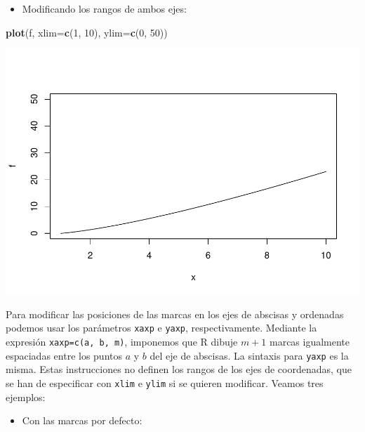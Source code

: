 \documentclass[
]{book}
\newenvironment{Shaded}{\begin{snugshade}}{\end{snugshade}}
\newcommand{\DataTypeTok}[1]{\textcolor[rgb]{0.13,0.29,0.53}{#1}}
\newcommand{\DecValTok}[1]{\textcolor[rgb]{0.00,0.00,0.81}{#1}}
\newcommand{\KeywordTok}[1]{\textcolor[rgb]{0.13,0.29,0.53}{\textbf{#1}}}
\newcommand{\NormalTok}[1]{#1}
\providecommand{\tightlist}{%
  \setlength{\itemsep}{0pt}\setlength{\parskip}{0pt}}
\theoremstyle{definition}
\theoremstyle{definition}
\theoremstyle{definition}
\theoremstyle{remark}
\begin{document}
\begin{itemize}
\tightlist
\item
  Modificando los rangos de ambos ejes:
\end{itemize}

\begin{Shaded}
\begin{Highlighting}[]
\KeywordTok{plot}\NormalTok{(f, }\DataTypeTok{xlim=}\KeywordTok{c}\NormalTok{(}\DecValTok{1}\NormalTok{, }\DecValTok{10}\NormalTok{), }\DataTypeTok{ylim=}\KeywordTok{c}\NormalTok{(}\DecValTok{0}\NormalTok{, }\DecValTok{50}\NormalTok{))  }
\end{Highlighting}
\end{Shaded}

\begin{center}\includegraphics[width=0.9\linewidth]{07chap06_Graficos_I_files/figure-latex/unnamed-chunk-16-1} \end{center}

Para modificar las posiciones de las marcas en los ejes de abscisas y ordenadas podemos usar los parámetros \texttt{xaxp} e \texttt{yaxp}, respectivamente. Mediante la expresión \texttt{xaxp=c(a,\ b,\ m)}, imponemos que R dibuje \(m+1\) marcas igualmente espaciadas entre los puntos \(a\) y \(b\) del eje de abscisas. La sintaxis para \texttt{yaxp} es la misma. Estas instrucciones no definen los rangos de los ejes de coordenadas, que se han de especificar con \texttt{xlim} e \texttt{ylim} si se quieren modificar. Veamos tres ejemplos:

\begin{itemize}
\tightlist
\item
  Con las marcas por defecto:
\end{itemize}
\end{document}
